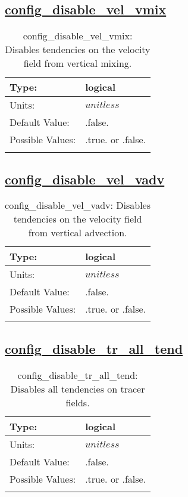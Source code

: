 \subsection[config\_disable\_vel\_vmix]{\hyperref[sec:nm_tab_debug]{config\_disable\_vel\_vmix}}
\label{subsec:nm_sec_config_disable_vel_vmix}
\begin{center}
\begin{longtable}{| p{2.0in} || p{4.0in} |}
    \hline
    Type: & logical \\
    \hline
    Units: & $unitless$ \\
    \hline
    Default Value: & .false. \\
    \hline
    Possible Values: & .true. or .false. \\
    \hline
    \caption{config\_disable\_vel\_vmix: Disables tendencies on the velocity field from vertical mixing.}
\end{longtable}
\end{center}
\subsection[config\_disable\_vel\_vadv]{\hyperref[sec:nm_tab_debug]{config\_disable\_vel\_vadv}}
\label{subsec:nm_sec_config_disable_vel_vadv}
\begin{center}
\begin{longtable}{| p{2.0in} || p{4.0in} |}
    \hline
    Type: & logical \\
    \hline
    Units: & $unitless$ \\
    \hline
    Default Value: & .false. \\
    \hline
    Possible Values: & .true. or .false. \\
    \hline
    \caption{config\_disable\_vel\_vadv: Disables tendencies on the velocity field from vertical advection.}
\end{longtable}
\end{center}
\subsection[config\_disable\_tr\_all\_tend]{\hyperref[sec:nm_tab_debug]{config\_disable\_tr\_all\_tend}}
\label{subsec:nm_sec_config_disable_tr_all_tend}
\begin{center}
\begin{longtable}{| p{2.0in} || p{4.0in} |}
    \hline
    Type: & logical \\
    \hline
    Units: & $unitless$ \\
    \hline
    Default Value: & .false. \\
    \hline
    Possible Values: & .true. or .false. \\
    \hline
    \caption{config\_disable\_tr\_all\_tend: Disables all tendencies on tracer fields.}
\end{longtable}
\end{center}
